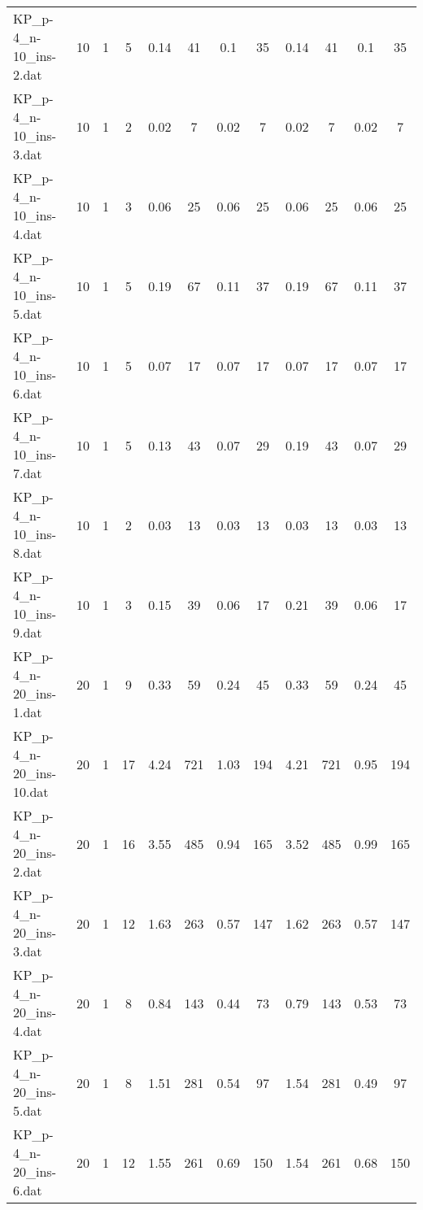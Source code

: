 \begin{sidewaystable}[!ht]
{\begin{tabular}{lccccccccccc}
KP\_p-4\_n-10\_ins-2.dat & 10 & 1 & 5 & 0.14 & 41 &  \textcolor{blue2}{0.1} & 35 & 0.14 & 41 &  \textcolor{blue2}{0.1} & 35 \\
KP\_p-4\_n-10\_ins-3.dat & 10 & 1 & 2 &  \textcolor{blue2}{0.02} & 7 &  \textcolor{blue2}{0.02} & 7 &  \textcolor{blue2}{0.02} & 7 &  \textcolor{blue2}{0.02} & 7 \\
KP\_p-4\_n-10\_ins-4.dat & 10 & 1 & 3 &  \textcolor{blue2}{0.06} & 25 &  \textcolor{blue2}{0.06} & 25 &  \textcolor{blue2}{0.06} & 25 &  \textcolor{blue2}{0.06} & 25 \\
KP\_p-4\_n-10\_ins-5.dat & 10 & 1 & 5 & 0.19 & 67 &  \textcolor{blue2}{0.11} & 37 & 0.19 & 67 &  \textcolor{blue2}{0.11} & 37 \\
KP\_p-4\_n-10\_ins-6.dat & 10 & 1 & 5 &  \textcolor{blue2}{0.07} & 17 &  \textcolor{blue2}{0.07} & 17 &  \textcolor{blue2}{0.07} & 17 &  \textcolor{blue2}{0.07} & 17 \\
KP\_p-4\_n-10\_ins-7.dat & 10 & 1 & 5 & 0.13 & 43 &  \textcolor{blue2}{0.07} & 29 & 0.19 & 43 &  \textcolor{blue2}{0.07} & 29 \\
KP\_p-4\_n-10\_ins-8.dat & 10 & 1 & 2 &  \textcolor{blue2}{0.03} & 13 &  \textcolor{blue2}{0.03} & 13 &  \textcolor{blue2}{0.03} & 13 &  \textcolor{blue2}{0.03} & 13 \\
KP\_p-4\_n-10\_ins-9.dat & 10 & 1 & 3 & 0.15 & 39 &  \textcolor{blue2}{0.06} & 17 & 0.21 & 39 &  \textcolor{blue2}{0.06} & 17 \\
KP\_p-4\_n-20\_ins-1.dat & 20 & 1 & 9 & 0.33 & 59 &  \textcolor{blue2}{0.24} & 45 & 0.33 & 59 &  \textcolor{blue2}{0.24} & 45 \\
KP\_p-4\_n-20\_ins-10.dat & 20 & 1 & 17 & 4.24 & 721 & 1.03 & 194 & 4.21 & 721 &  \textcolor{blue2}{0.95} & 194 \\
KP\_p-4\_n-20\_ins-2.dat & 20 & 1 & 16 & 3.55 & 485 &  \textcolor{blue2}{0.94} & 165 & 3.52 & 485 & 0.99 & 165 \\
KP\_p-4\_n-20\_ins-3.dat & 20 & 1 & 12 & 1.63 & 263 &  \textcolor{blue2}{0.57} & 147 & 1.62 & 263 &  \textcolor{blue2}{0.57} & 147 \\
KP\_p-4\_n-20\_ins-4.dat & 20 & 1 & 8 & 0.84 & 143 &  \textcolor{blue2}{0.44} & 73 & 0.79 & 143 & 0.53 & 73 \\
KP\_p-4\_n-20\_ins-5.dat & 20 & 1 & 8 & 1.51 & 281 & 0.54 & 97 & 1.54 & 281 &  \textcolor{blue2}{0.49} & 97 \\
KP\_p-4\_n-20\_ins-6.dat & 20 & 1 & 12 & 1.55 & 261 & 0.69 & 150 & 1.54 & 261 &  \textcolor{blue2}{0.68} & 150 \\

\end{tabular}}
\end{sidewaystable}
